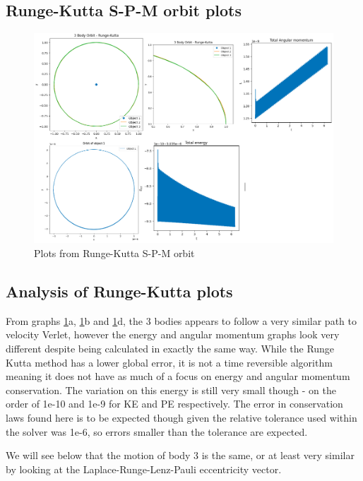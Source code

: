 \documentclass[11pt]{article}
\begin{document}
\subsection{Runge-Kutta S-P-M orbit plots}


\begin{figure}[!ht]
\centerline{\includegraphics[scale=0.38]{Pictures/SEM_RK.png}}
\caption{Plots from Runge-Kutta S-P-M orbit}
\label{SEM_RK}
\end{figure}


\subsection{Analysis of Runge-Kutta plots}

From graphs \ref{SEM_RK}a, \ref{SEM_RK}b and \ref{SEM_RK}d, the 3 bodies appears to follow a very similar path to velocity Verlet, however the energy and angular momentum graphs look very different despite being calculated in exactly the same way. While the Runge Kutta method has a lower global error, it is not a time reversible algorithm meaning it does not have as much of a focus on energy and angular momentum conservation. The variation on this energy is still very small though - on the order of 1e-10 and 1e-9 for KE and PE respectively. The error in conservation laws found here is to be expected though given the relative tolerance used within the solver was 1e-6, so errors smaller than the tolerance are expected.

\smallskip

We will see below that the motion of body 3 is the same, or at least very similar by looking at the Laplace-Runge-Lenz-Pauli eccentricity vector.
\end{document}
